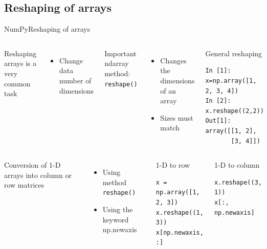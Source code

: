 \documentclass[10pt,compress]{beamer} %
\begin{document}
\subsection{Reshaping of arrays}
\begin{frame}[fragile]{NumPy}{Reshaping of arrays}
	\begin{columns}
		Reshaping arrays is a very common task
		\begin{itemize}
			\item Change data number of dimensions
		\end{itemize}
		Important ndarray method: \texttt{reshape()}
		\begin{itemize}
			\item Changes the dimensions of an array
			\item Sizes must match
		\end{itemize}

		\begin{exampleblock}{\footnotesize{General reshaping}}
		\vspace{-0.2cm} 
			\begin{lstlisting}
In [1]: x=np.array([1, 2, 3, 4])
In [2]: x.reshape((2,2))
Out[1]: 
array([[1, 2],
       [3, 4]])
			\end{lstlisting}
		\vspace{-0.2cm} 
		\end{exampleblock}
	\end{columns}

	\begin{columns}
	   \column{0.5\textwidth}
		Conversion of 1-D arrays into column or row matrices
		\begin{itemize}
			\item Using method \texttt{reshape()}
			\item Using the keyword \alert{np.newaxis}
		\end{itemize}

 	   \column{0.5\textwidth}
		\begin{exampleblock}{\footnotesize{1-D to row}}
		\vspace{-0.2cm} 
			\begin{lstlisting}
x = np.array([1, 2, 3])
x.reshape((1, 3))
x[np.newaxis, :]
			\end{lstlisting}
		\vspace{-0.2cm} 
		\end{exampleblock}

		\begin{exampleblock}{\footnotesize{1-D to column}}
		\vspace{-0.2cm} 
			\begin{lstlisting}
x.reshape((3, 1))
x[:, np.newaxis]
			\end{lstlisting}
		\vspace{-0.2cm} 
		\end{exampleblock}
	\end{columns}
\end{frame}
\end{document}
